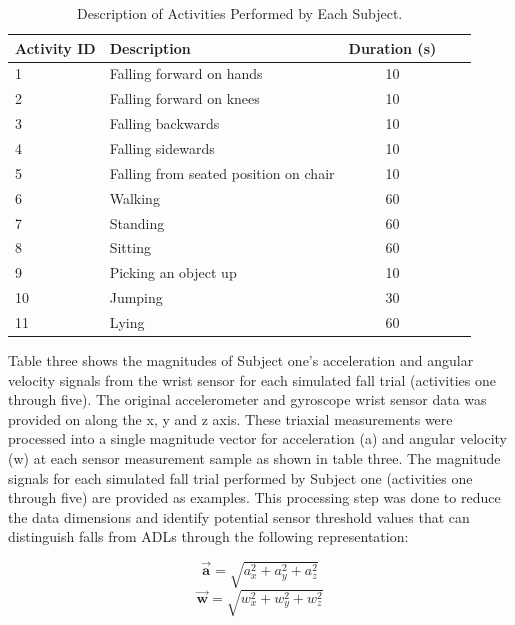 \documentclass{llncs}
\begin{document}
\begin{table}
	\begin{center}
		\caption{Description of Activities Performed by Each Subject.}
		\label{table2}
		\begin{tabular}{llclr}
			\toprule
			Activity ID & Description & Duration (s)\\
			\midrule
			1 &  Falling forward on hands & 10\\
			2 &  Falling forward on knees & 10\\
			3 & Falling backwards & 10\\
			4 & Falling sidewards & 10\\
			5 & Falling from seated position on chair & 10\\
			6 & Walking & 60\\
			7 & Standing & 60\\
			8 & Sitting & 60\\
			9 & Picking an object up & 10\\
			10 & Jumping & 30\\
			11 & Lying & 60\\
			\bottomrule
		\end{tabular}
	\end{center}
\end{table}

	Table three shows the magnitudes of Subject one's acceleration and angular velocity signals from the wrist sensor for each simulated fall trial (activities one through five). The original accelerometer and gyroscope wrist sensor data was provided on along the x, y and z axis. These triaxial measurements were processed into a single magnitude vector for acceleration (a) and angular velocity (w) at each sensor measurement sample as shown in table three. The magnitude signals for each simulated fall trial performed by Subject one (activities one through five) are provided as examples. This processing step was done to reduce the data dimensions and identify potential sensor threshold values that can distinguish falls from ADLs through the following representation:
	
	\begin{equation*}
    		\vec{\mathbf{a}} = \sqrt{a_{x}^2 + a_{y}^2 + a_{z}^2}
	\end{equation*} 
	\begin{equation*}
		\vec{\mathbf{w}} = \sqrt{w_{x}^2 + w_{y}^2 + w_{z}^2}
	\end{equation*} 
	
\end{document}
